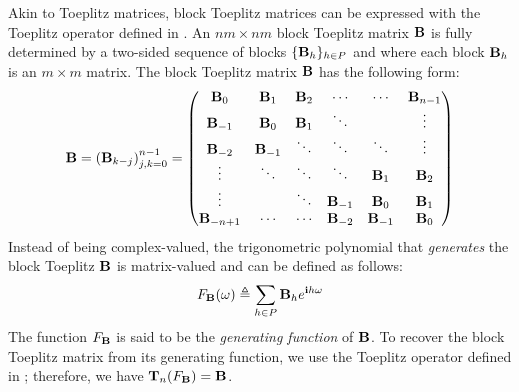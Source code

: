 Akin to Toeplitz matrices, block Toeplitz matrices can be expressed with the Toeplitz operator defined in .
An $nm \times nm$ block Toeplitz matrix $\mathbf{B}$ is fully determined by a two-sided sequence of blocks $\{\mathbf{B}_h\}_{h \in P}$ and where each block $\mathbf{B}_h$ is an $m \times m$ matrix.  
The block Toeplitz matrix $\mathbf{B}$ has the following form:
\begin{equation}
  \Bmat = \leftmat \Bmat_{k-j} \rightmat_{j,k = 0}^{n-1} = 
  \leftmatrix
    \Bmat_{0}    & \Bmat_{1}  & \Bmat_{2} & \cdots     & \cdots     & \Bmat_{n-1} \\
    \Bmat_{-1}   & \Bmat_{0}  & \Bmat_{1} & \ddots     &            & \vdots      \\
    \Bmat_{-2}   & \Bmat_{-1} & \ddots    & \ddots     & \ddots     & \vdots      \\ 
    \vdots       & \ddots     & \ddots    & \ddots     & \Bmat_{1}  & \Bmat_{2}   \\
    \vdots       &            & \ddots    & \Bmat_{-1} & \Bmat_{0}  & \Bmat_{1}   \\
    \Bmat_{-n+1} & \cdots     & \cdots    & \Bmat_{-2} & \Bmat_{-1} & \Bmat_0
  \rightmatrix
\end{equation}
\noindent
Instead of being complex-valued, the trigonometric polynomial that \emph{generates} the block Toeplitz $\mathbf{B}$ is matrix-valued and can be defined as follows:
\begin{equation}
  F_{\mathbf{B}}(\omega) \triangleq \sum_{h \in P} \mathbf{B}_h e^{\mathbf{i} h \omega}
\end{equation}
The function $F_{\mathbf{B}}$ is said to be the \emph{generating function} of $\mathbf{B}$.
To recover the block Toeplitz matrix from its generating function, we use the Toeplitz operator defined in ; therefore, we have $\mathbf{T}_n(F_\mathbf{B}) = \mathbf{B}$.

